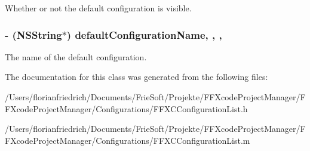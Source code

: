 Whether or not the default configuration is visible. \hypertarget{interface_f_f_x_c_configuration_list_a81391b97ff59d1c9fe7bb5e0915af00e}{
\subsubsection[{default\-Configuration\-Name}]{\setlength{\rightskip}{0pt plus 5cm}-\/ (N\-S\-String$\ast$) default\-Configuration\-Name\hspace{0.3cm}{\ttfamily [read]}, {\ttfamily [write]}, {\ttfamily [nonatomic]}, {\ttfamily [strong]}}}\label{interface_f_f_x_c_configuration_list_a81391b97ff59d1c9fe7bb5e0915af00e}
The name of the default configuration. 

The documentation for this class was generated from the following files\-:\begin{DoxyCompactItemize}
\item 
/\-Users/florianfriedrich/\-Documents/\-Frie\-Soft/\-Projekte/\-F\-F\-Xcode\-Project\-Manager/\-F\-F\-Xcode\-Project\-Manager/\-Configurations/F\-F\-X\-C\-Configuration\-List.\-h\item 
/\-Users/florianfriedrich/\-Documents/\-Frie\-Soft/\-Projekte/\-F\-F\-Xcode\-Project\-Manager/\-F\-F\-Xcode\-Project\-Manager/\-Configurations/F\-F\-X\-C\-Configuration\-List.\-m\end{DoxyCompactItemize}
